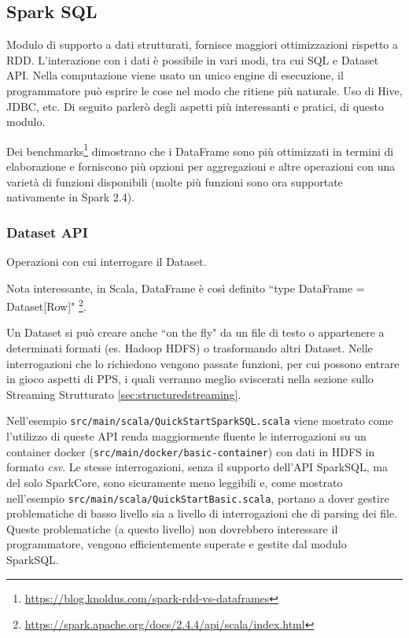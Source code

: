 \documentclass[12pt,italian]{article}
\begin{document}
\subsection{Spark SQL}\label{sec:SparkSQL}
Modulo di supporto a dati strutturati, fornisce maggiori ottimizzazioni rispetto a RDD. L'interazione con i dati è possibile in vari modi, tra cui SQL e Dataset API.
Nella computazione viene usato un unico engine di esecuzione, il programmatore può esprire le cose nel modo che ritiene più naturale. Uso di Hive, JDBC, etc. 
\newline
Di seguito parlerò degli aspetti più interessanti e pratici, di questo modulo.
\par Dei benchmarks\footnote{\url{https://blog.knoldus.com/spark-rdd-vs-dataframes}} dimostrano che i DataFrame sono più ottimizzati in termini di elaborazione e forniscono più opzioni per aggregazioni e altre operazioni con una varietà di funzioni disponibili (molte più funzioni sono ora supportate nativamente in Spark 2.4).
\subsubsection{Dataset API}
Operazioni con cui interrogare il Dataset. 
\par Nota interessante, in Scala, DataFrame è così definito ``type DataFrame = Dataset[Row]" \footnote{\url{https://spark.apache.org/docs/2.4.4/api/scala/index.html}}.
\par Un Dataset si può creare anche ``on the fly" da un file di testo o appartenere a determinati formati (es. Hadoop HDFS) o trasformando altri Dataset.
Nelle interrogazioni che lo richiedono vengono passate funzioni, per cui possono entrare in gioco aspetti di PPS, i quali verranno meglio sviscerati nella sezione sullo Streaming Strutturato \ref{sec:structuredstreaming}.%
\par Nell'esempio \texttt{src/main/scala/QuickStartSparkSQL.scala} viene mostrato come l'utilizzo di queste API renda maggiormente fluente le interrogazioni su un container docker (\texttt{src/main/docker/basic-container}) con dati in HDFS in formato \textit{csv}.
\newline 
Le stesse interrogazioni, senza il supporto dell'API SparkSQL, ma del solo SparkCore, sono sicuramente meno leggibili e, come mostrato nell'esempio \texttt{src/main/scala/QuickStartBasic.scala}, portano a dover gestire problematiche di basso livello sia a livello di interrogazioni che di parsing dei file. Queste problematiche (a questo livello) non dovrebbero interessare il programmatore, vengono efficientemente superate e gestite dal modulo SparkSQL.
\end{document}
